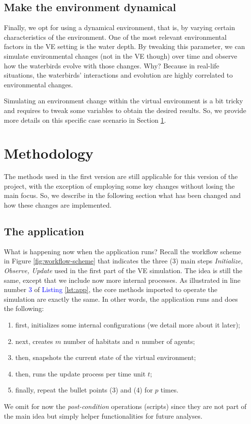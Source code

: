 \subsection{Make the environment dynamical}
Finally, we opt for using a dynamical environment, that is, by varying certain characteristics of the environment. One of the most relevant environmental factors in the VE setting is the water depth. By tweaking this parameter, we can simulate environmental changes (not in the VE though) over time and observe how the waterbirds evolve with those changes. Why? Because in real-life situations, the waterbirds' interactions and evolution are highly correlated to environmental changes.

Simulating an environment change within the virtual environment is a bit tricky and requires to tweak some variables to obtain the desired results. So, we provide more details on this specific case scenario in Section \ref{sec:methodology}.


\section{Methodology}\label{sec:methodology}
The methods used in the first version are still applicable for this version of the project, with the exception of employing some key changes without losing the main focus. So, we describe in the following section what has been changed and how these changes are implemented.

\subsection{The application}
What is happening now when the application runs? Recall the workflow scheme in Figure \ref{fig:workflow-scheme} that indicates the three (3) main steps \textit{Initialize, Observe, Update} used in the first part of the VE simulation. The idea is still the same, except that we include now more internal processes. As illustrated in line number \textcolor{blue}{3} of \textcolor{blue}{Listing} \ref{lst:app}, the core methods imported to operate the simulation are exactly the same. In other words, the application runs and does the following:
\begin{enumerate}
    \item first, initializes some internal configurations (we detail more about it later);
    \item next, creates $m$ number of habitats and $n$ number of agents;
    \item then, snapshots the current state of the virtual environment;
    \item then, runs the update process per time unit $t$;
    \item finally, repeat the bullet points (3) and (4) for $p$ times.
\end{enumerate}
We omit for now the \emph{post-condition} operations (scripts) since they are not part of the main idea but simply helper functionalities for future analyses.

